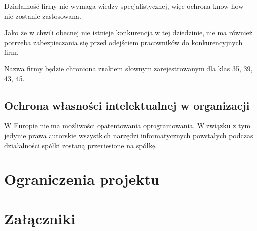 \documentclass{article}
\begin{document}
Działalność firmy nie wymaga wiedzy specjalistycznej, więc ochrona know-how nie zostanie zastosowana.

Jako że w chwili obecnej nie istnieje konkurencja w tej dziedzinie, nie ma również potrzeba zabezpieczania się przed odejściem pracowników do konkurencyjnych firm.

Nazwa firmy będzie chroniona znakiem słownym zarejestrowanym dla klas 35, 39, 43, 45.
\subsection{Ochrona własności intelektualnej w organizacji}
W Europie nie ma możliwości opatentowania oprogramowania. W związku z tym jedynie prawa autorskie wszystkich narzędzi informatycznych powstałych podczas działalności spółki zostaną przeniesione na spółkę.

\section{Ograniczenia projektu}


\section{Załączniki}
\end{document}
